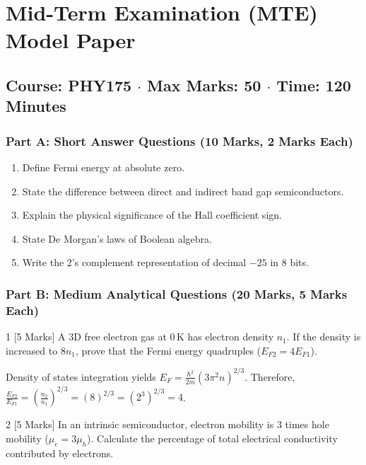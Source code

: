 \chapter{Mid-Term Examination (MTE) Model Paper}
\section*{Course: PHY175 $\cdot$ Max Marks: 50 $\cdot$ Time: 120 Minutes}

\subsection*{Part A: Short Answer Questions (10 Marks, 2 Marks Each)}
\begin{enumerate}[leftmargin=*]
    \item Define Fermi energy at absolute zero.
    \item State the difference between direct and indirect band gap semiconductors.
    \item Explain the physical significance of the Hall coefficient sign.
    \item State De Morgan's laws of Boolean algebra.
    \item Write the 2's complement representation of decimal $-25$ in 8 bits.
\end{enumerate}

\subsection*{Part B: Medium Analytical Questions (20 Marks, 5 Marks Each)}

\begin{examqbox}{1 [5 Marks]}
A 3D free electron gas at $0\,\text{K}$ has electron density $n_1$. If the density is increased to $8n_1$, prove that the Fermi energy quadruples ($E_{F2} = 4E_{F1}$).
\end{examqbox}

\begin{solbox}
Density of states integration yields $E_F = \frac{\hbar^2}{2m}(3\pi^2 n)^{2/3}$. Therefore, $\frac{E_{F2}}{E_{F1}} = \left(\frac{n_2}{n_1}\right)^{2/3} = (8)^{2/3} = (2^3)^{2/3} = 4$.
\end{solbox}

\begin{examqbox}{2 [5 Marks]}
In an intrinsic semiconductor, electron mobility is 3 times hole mobility ($\mu_e = 3\mu_h$). Calculate the percentage of total electrical conductivity contributed by electrons.
\end{examqbox}

